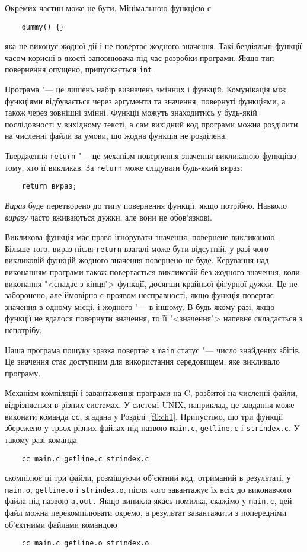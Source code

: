 \documentclass[a4paper,12pt]{book}
\begin{document}
  Окремих частин може не бути. Мінімальною функцією є
  \begin{verbatim}
    dummy() {}
  \end{verbatim}
  яка не виконує жодної дії і не повертає жодного значення. Такі бездіяльні функції часом
  корисні в якості заповнювача під час розробки програми. Якщо тип повернення опущено,
  припускається \texttt{int}.

  Програма "--- це лишень набір визначень змінних і функцій. Комунікація між функціями
  відбувається через аргументи та значення, повернуті функціями, а також через зовнішні
  змінні. Функції можуть знаходитись у будь-якій послідовності у вихідному тексті, а сам
  вихідний код програми можна розділити на численні файли за умови, що жодна функція не
  розділена.

  Твердження \texttt{return} "--- це механізм повернення значення викликаною функцією
  тому, хто її викликав. За \texttt{return} може слідувати будь-який вираз:
  \begin{verbatim}
    return вираз;
  \end{verbatim}

  \textit{Вираз} буде перетворено до типу повернення функції, якщо потрібно. Навколо
  \textit{виразу} часто вживаються дужки, але вони не обов'язкові.

  Викликова функція має право ігнорувати значення, повернене викликаною. Більше того,
  вираз після \texttt{return} взагалі може бути відсутній, у разі чого викликовій функцій
  жодного значення повернено не буде. Керування над виконанням програми також повертається
  викликовій без жодного значення, коли виконання "<спадає з кінця"> функції,
  досягши крайньої фігурної дужки. Це не заборонено, але ймовірно є проявом несправності,
  якщо функція повертає значення в одному місці, і жодного "--- в іншому. В будь-якому
  разі, якщо функції не вдалося повернути значення, то її "<значення"> напевне
  складається з непотрібу.

  Наша програма пошуку зразка повертає з \texttt{main} статус "--- число знайдених
  збігів. Це значення стає доступним для використання середовищем, яке викликало
  програму.

  Механізм компіляції і завантаження програми на C, розбитої на численні файли,
  відрізняється в різних системах. У системі UNIX, наприклад, це завдання може виконати
  команда \texttt{cc}, згадана у Розділі~\ref{f0:ch1}. Припустімо, що три функції
  збережено у трьох різних файлах під назвою \texttt{main.c}, \texttt{getline.c} і
  \texttt{strindex.c}. У такому разі команда
  \begin{verbatim}
    cc main.c getline.c strindex.c
  \end{verbatim}
  скомпілює ці три файли, розміщуючи об'єктний код, отриманий в результаті, у
  \texttt{main.o}, \texttt{getline.o} і \texttt{strindex.o}, після чого завантажує їх всіх
  до виконавчого файла під назвою \texttt{a.out.} Якщо виникла якась помилка, скажімо у
  \texttt{main.c}, цей файл можна перекомпілювати окремо, а результат завантажити з
  попередніми об'єктними файлами командою
  \begin{verbatim}
    cc main.c getline.o strindex.o
  \end{verbatim}
\end{document}
